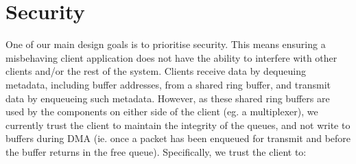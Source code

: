 \section{Security}
One of our main design goals is to prioritise security. This means ensuring a 
misbehaving client application does not have the ability to interfere with other clients and/or the rest of the system. Clients receive
data by dequeuing metadata, including buffer addresses, from a shared ring buffer, and transmit data by enqueueing such metadata. 
However, as these shared ring buffers are used by the components on either side of the client (eg. a multiplexer), we currently 
trust the client to maintain the integrity of the queues, and not write to buffers during DMA (ie. once a packet has been enqueued
for transmit and before the buffer returns in the free queue). Specifically, we trust the client to:

